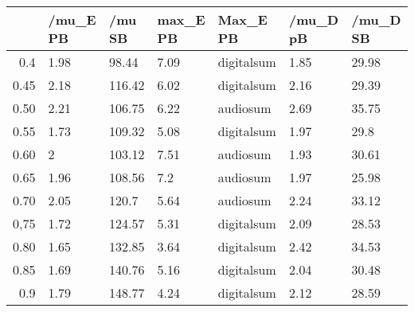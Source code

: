 \begin{table}[ht]
\centering
\begin{tabular}{rllllll}
  \hline
 & /mu\_E PB & /mu SB & max\_E PB & Max\_E PB & /mu\_D pB & /mu\_D SB \\ 
  \hline
0.4 & 1.98 & 98.44 & 7.09 & digitalsum & 1.85 & 29.98 \\ 
  0.45 & 2.18 & 116.42 & 6.02 & digitalsum & 2.16 & 29.39 \\ 
  0.50 & 2.21 & 106.75 & 6.22 & audiosum & 2.69 & 35.75 \\ 
  0.55 & 1.73 & 109.32 & 5.08 & digitalsum & 1.97 & 29.8 \\ 
  0.60 & 2 & 103.12 & 7.51 & audiosum & 1.93 & 30.61 \\ 
  0.65 & 1.96 & 108.56 & 7.2 & audiosum & 1.97 & 25.98 \\ 
  0.70 & 2.05 & 120.7 & 5.64 & audiosum & 2.24 & 33.12 \\ 
  0,75 & 1.72 & 124.57 & 5.31 & digitalsum & 2.09 & 28.53 \\ 
  0.80 & 1.65 & 132.85 & 3.64 & digitalsum & 2.42 & 34.53 \\ 
  0.85 & 1.69 & 140.76 & 5.16 & digitalsum & 2.04 & 30.48 \\ 
  0.9 & 1.79 & 148.77 & 4.24 & digitalsum & 2.12 & 28.59 \\ 
   \hline
\end{tabular}
\end{table}
